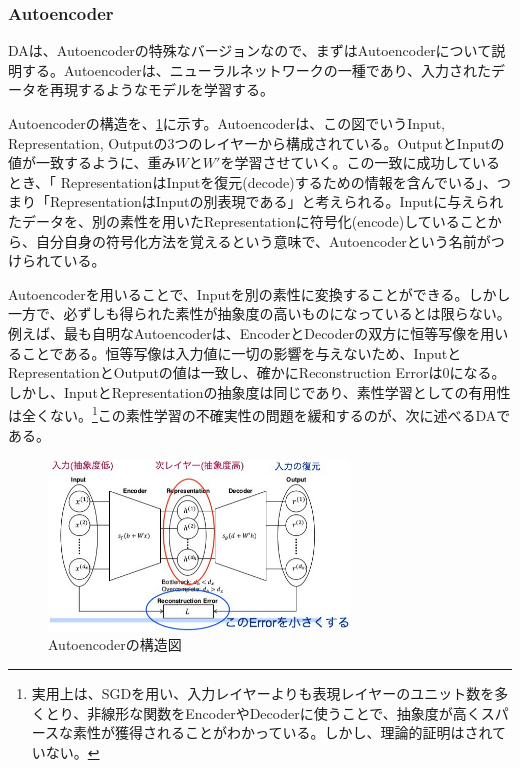 \subsubsection{Autoencoder}
DAは、Autoencoderの特殊なバージョンなので、まずはAutoencoderについて説明する。Autoencoderは、ニューラルネットワークの一種であり、入力されたデータを再現するようなモデルを学習する。\cite{bourlard1988auto, hinton1994autoencoders, schwenk1995transformation}\par
Autoencoderの構造を、\ref{c3_autoencoder}に示す。Autoencoderは、この図でいうInput, Representation, Outputの3つのレイヤーから構成されている。OutputとInputの値が一致するように、重み$W$と$W'$を学習させていく。この一致に成功しているとき、「
RepresentationはInputを復元(decode)するための情報を含んでいる」、つまり「RepresentationはInputの別表現である」と考えられる。Inputに与えられたデータを、別の素性を用いたRepresentationに符号化(encode)していることから、自分自身の符号化方法を覚えるという意味で、Autoencoderという名前がつけられている。\par
Autoencoderを用いることで、Inputを別の素性に変換することができる。しかし一方で、必ずしも得られた素性が抽象度の高いものになっているとは限らない。例えば、最も自明なAutoencoderは、EncoderとDecoderの双方に恒等写像を用いることである。恒等写像は入力値に一切の影響を与えないため、InputとRepresentationとOutputの値は一致し、確かにReconstruction Errorは0になる。しかし、InputとRepresentationの抽象度は同じであり、素性学習としての有用性は全くない。\footnote{実用上は、SGDを用い、入力レイヤーよりも表現レイヤーのユニット数を多くとり、非線形な関数をEncoderやDecoderに使うことで、抽象度が高くスパースな素性が獲得されることがわかっている\cite{bengio2007greedy}\cite{lee2007sparse}。しかし、理論的証明はされていない。}この素性学習の不確実性の問題を緩和するのが、次に述べるDAである。
\begin{figure}[tbp]
 \begin{center}
  \includegraphics[width=80mm]{img/c3/autoencoder}
 \end{center}
 \caption{Autoencoderの構造図}
 \label{c3_autoencoder}
\end{figure}

